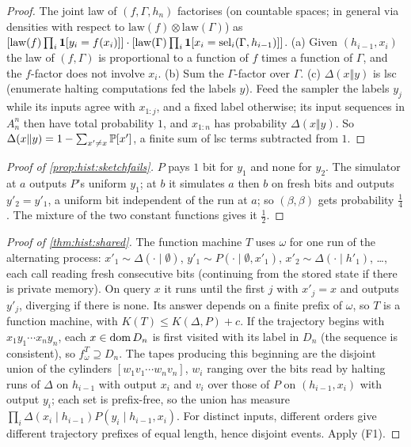 \begin{proof}
The joint law of $(f,\Gamma,h_n)$ factorises (on countable spaces; in general via densities with respect to $\mathrm{law}(f)\otimes\mathrm{law}(\Gamma)$) as $[\mathrm{law}(f)\prod_i\mathbf{1}[y_i=f(x_i)]]\cdot[\mathrm{law}(\Gamma)\prod_i\mathbf{1}[x_i=\mathrm{sel}_i(\Gamma,h_{i-1})]]$. (a) Given $(h_{i-1},x_i)$ the law of $(f,\Gamma)$ is proportional to a function of $f$ times a function of $\Gamma$, and the $f$-factor does not involve $x_i$. (b) Sum the $\Gamma$-factor over $\Gamma$. (c) $\Delta(x\Vert y)$ is lsc (enumerate halting computations fed the labels $y$). Feed the sampler the labels $y_j$ while its inputs agree with $x_{1:j}$, and a fixed label otherwise; its input sequences in $A_n^n$ then have total probability $1$, and $x_{1:n}$ has probability $\Delta(x\Vert y)$. So $\Delta(x\Vert y)=1-\sum_{x'\ne x}\mathbb{P}[x']$, a finite sum of lsc terms subtracted from $1$.
\end{proof}

\begin{proof}[Proof of \cref{prop:hist:sketchfails}]
$P$ pays $1$ bit for $y_1$ and none for $y_2$. The simulator at $a$ outputs $P$'s uniform $y_1$; at $b$ it simulates $a$ then $b$ on fresh bits and outputs $y'_2=y'_1$, a uniform bit independent of the run at $a$; so $(\beta,\beta)$ gets probability $\frac14$. The mixture of the two constant functions gives it $\frac12$.
\end{proof}

\begin{proof}[Proof of \cref{thm:hist:shared}]
The function machine $T$ uses $\omega$ for one run of the alternating process: $x'_1\sim\Delta(\cdot\mid\emptyset)$, $y'_1\sim P(\cdot\mid\emptyset,x'_1)$, $x'_2\sim\Delta(\cdot\mid h'_1)$, \dots, each call reading fresh consecutive bits (continuing from the stored state if there is private memory). On query $x$ it runs until the first $j$ with $x'_j=x$ and outputs $y'_j$, diverging if there is none. Its answer depends on a finite prefix of $\omega$, so $T$ is a function machine, with $K(T)\le K(\Delta,P)+c$. If the trajectory begins with $x_1y_1\cdots x_ny_n$, each $x\in\operatorname{dom} D_n$ is first visited with its label in $D_n$ (the sequence is consistent), so $f^T_\omega\supseteq D_n$. The tapes producing this beginning are the disjoint union of the cylinders $[w_1v_1\cdots w_nv_n]$, $w_i$ ranging over the bits read by halting runs of $\Delta$ on $h_{i-1}$ with output $x_i$ and $v_i$ over those of $P$ on $(h_{i-1},x_i)$ with output $y_i$; each set is prefix-free, so the union has measure $\prod_i\Delta(x_i\mid h_{i-1})P(y_i\mid h_{i-1},x_i)$. %
For distinct inputs, different orders give different trajectory prefixes of equal length, hence disjoint events. Apply (F1).
\end{proof}

